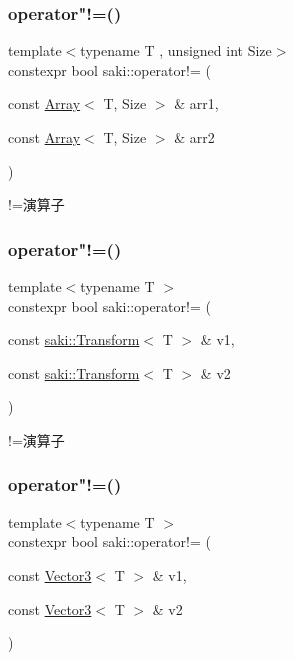 \subsubsection{\texorpdfstring{operator"!=()}{operator!=()}\hspace{0.1cm}{\footnotesize\ttfamily [1/11]}}
{\footnotesize\ttfamily template$<$typename T , unsigned int Size$>$ \\
constexpr bool saki\+::operator!= (\begin{DoxyParamCaption}\item[{const \mbox{\hyperlink{classsaki_1_1_array}{Array}}$<$ T, Size $>$ \&}]{arr1,  }\item[{const \mbox{\hyperlink{classsaki_1_1_array}{Array}}$<$ T, Size $>$ \&}]{arr2 }\end{DoxyParamCaption})}



!=演算子 

\mbox{\label{namespacesaki_aeb1efde4ebc127c358fe17c9725fc622}} 
\subsubsection{\texorpdfstring{operator"!=()}{operator!=()}\hspace{0.1cm}{\footnotesize\ttfamily [2/11]}}
{\footnotesize\ttfamily template$<$typename T $>$ \\
constexpr bool saki\+::operator!= (\begin{DoxyParamCaption}\item[{const \mbox{\hyperlink{classsaki_1_1_transform}{saki\+::\+Transform}}$<$ T $>$ \&}]{v1,  }\item[{const \mbox{\hyperlink{classsaki_1_1_transform}{saki\+::\+Transform}}$<$ T $>$ \&}]{v2 }\end{DoxyParamCaption})}



!=演算子 

\mbox{\label{namespacesaki_a49b3805c2b97e135606939b8d64eca20}} 
\subsubsection{\texorpdfstring{operator"!=()}{operator!=()}\hspace{0.1cm}{\footnotesize\ttfamily [3/11]}}
{\footnotesize\ttfamily template$<$typename T $>$ \\
constexpr bool saki\+::operator!= (\begin{DoxyParamCaption}\item[{const \mbox{\hyperlink{classsaki_1_1_vector3}{Vector3}}$<$ T $>$ \&}]{v1,  }\item[{const \mbox{\hyperlink{classsaki_1_1_vector3}{Vector3}}$<$ T $>$ \&}]{v2 }\end{DoxyParamCaption})}



